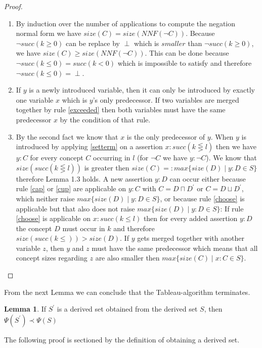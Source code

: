 \documentclass[a4paper,11pt]{scrartcl}
\theoremstyle{break}
\theoremstyle{definition}
\newtheorem{mylem}{Lemma}
\begin{document}
\begin{proof}$ $\\
\vspace*{-5mm}
\begin{enumerate}
\item By induction over the number of applications to compute the negation normal form we have $size(C)=size(NNF(\neg C))$. Because $\neg succ(k\geq0)$ can be replace by $\perp$ which is $smaller$ than $\neg succ(k\geq 0)$, we have $size(C)\geq size(NNF(\neg C))$. This can be done because $\neg succ(k\leq 0)= succ(k<0)$ which is impossible to satisfy and therefore $\neg succ(k\leq 0)=\perp$.
\item If $y$ is a newly introduced variable, then it can only be introduced by exactly one variable $x$ which is $y$'s only predecessor. If two variables are merged together by rule \ref{exceeded} then both variables must have the same predecessor $x$ by the condition of that rule.
\item By the second fact we know that $x$ is the only predecessor of $y$. When $y$ is introduced by applying \ref{setterm} on a assertion $x:succ(k\lesseqgtr l)$ then we have $y:C$ for every concept $C$ occurring in $l$ (for $\neg C$ we have $y:\neg C$). We know that $size(succ(k\lesseqgtr l))$ is greater then $size(C)=:max\{size(D)\mid y:D\in S\}$ therefore Lemma 1.3 holds. A new assertion $y:D$ can occur either because rule \ref{cap} or \ref{cup} are applicable on $y:C$ with $C=D\sqcap D^\prime$ or $C=D\sqcup D^\prime$, which neither raise $max\{size(D)\mid y:D \in S\}$, or because rule \ref{choose} is applicable but that also does not raise $max\{size(D)\mid y:D \in S\}$: If rule \ref{choose} is applicable on $x:succ(k\leq l)$ then for every added assertion $y:D$ the concept $D$ must occur in $k$ and therefore $size(succ(k\leq))>size(D)$. If $y$ gets merged together with another variable $z$, then $y$ and $z$ must have the same predecessor which means that all concept sizes regarding $z$ are also smaller then $max\{size(C)\mid x:C\in S\}$. 
\end{enumerate}
\end{proof}
From the next Lemma we can conclude that the Tableau-algorithm terminates.
\begin{mylem}
If $S^\prime$ is a derived set obtained from the derived set $S$, then $\Psi(S^\prime)\prec\Psi(S)$
\end{mylem}
The following proof is sectioned by the definition of obtaining a derived set.
\end{document}
